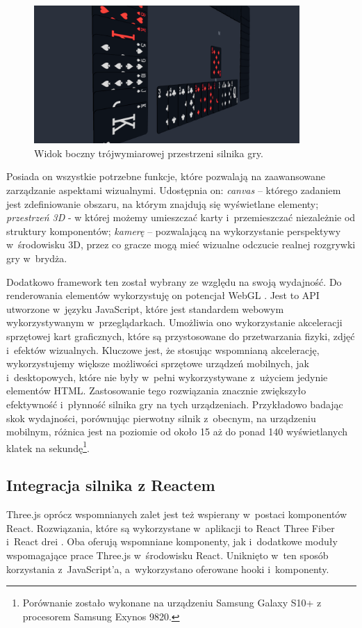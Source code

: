 \begin{figure}[hbt!]
  \centering
  \includegraphics[width=0.9\textwidth]{img/bridge-engine/orbit.png}
  \caption{Widok boczny trójwymiarowej przestrzeni silnika gry.}
  \label{fig:engine_orbit}
\end{figure}

Posiada on wszystkie potrzebne funkcje, które pozwalają na zaawansowane
zarządzanie aspektami wizualnymi. Udostępnia on:
\textit{canvas} -- którego zadaniem jest zdefiniowanie
obszaru, na którym znajdują się wyświetlane elementy;
\textit{przestrzeń 3D} - w której możemy umieszczać
karty i~przemieszczać niezależnie od struktury komponentów;
\textit{kamerę} -- pozwalającą na wykorzystanie perspektywy
w~środowisku 3D, przez co gracze mogą mieć wizualne
odczucie realnej rozgrywki gry w~brydża.

Dodatkowo framework ten został wybrany ze względu na swoją wydajność.
Do renderowania elementów wykorzystuję on potencjał WebGL \cite{WebGL}.
Jest to API utworzone
w~języku JavaScript, które jest standardem webowym wykorzystywanym
w~przeglądarkach. Umożliwia ono wykorzystanie akceleracji sprzętowej kart
graficznych, które są przystosowane do przetwarzania fizyki, zdjęć
i~efektów wizualnych. Kluczowe jest, że stosując wspomnianą akcelerację,
wykorzystujemy większe możliwości sprzętowe urządzeń mobilnych, jak
i~desktopowych, które nie były w~pełni wykorzystywane z~użyciem
jedynie elementów HTML.
Zastosowanie tego rozwiązania
znacznie zwiększyło efektywność i~płynność silnika gry na tych urządzeniach.
Przykładowo badając skok wydajności, porównując pierwotny silnik z~obecnym,
na urządzeniu mobilnym, różnica jest na poziomie od około 15 aż do
ponad 140 wyświetlanych
klatek na sekundę\footnote{
  Porównanie zostało wykonane na urządzeniu
  Samsung Galaxy S10+ z procesorem Samsung Exynos 9820.
}.

\FloatBarrier

\subsection{Integracja silnika z Reactem}
Three.js oprócz wspomnianych zalet jest też wspierany w~postaci komponentów React.
Rozwiązania, które są wykorzystane w~aplikacji to React Three Fiber
\cite{ReactThreeFiber} i~React drei \cite{ReactDrei}. Oba oferują
wspomniane komponenty, jak i~dodatkowe moduły
wspomagające prace Three.js w~środowisku React. Uniknięto w~ten sposób korzystania
z~JavaScript'a, a~wykorzystano oferowane hooki i~komponenty.



